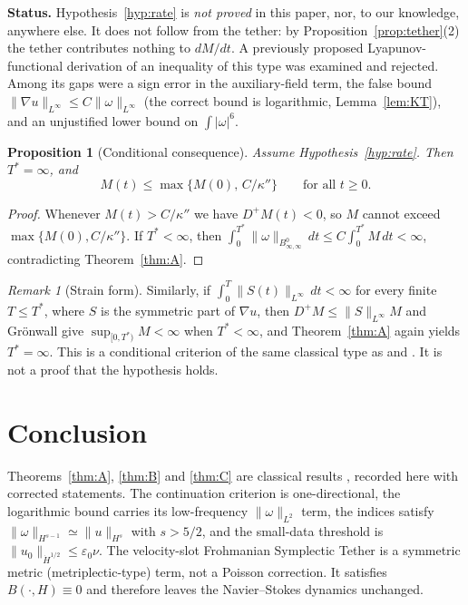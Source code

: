 \documentclass[11pt,reqno]{amsart}
\newtheorem{proposition}[lemma]{Proposition}
\theoremstyle{definition}
\theoremstyle{remark}
\newtheorem{remark}[lemma]{Remark}
\newcommand{\Bz}{B^0_{\infty,\infty}}
\newcommand{\dH}[1]{\dot H^{#1}}
\newcommand{\norm}[1]{\lVert #1\rVert}
\newcommand{\abs}[1]{\lvert #1\rvert}
\begin{document}
\noindent\textbf{Status.} Hypothesis~\ref{hyp:rate} is \emph{not proved} in this paper, nor, to our knowledge, anywhere else. It does not follow from the tether: by Proposition~\ref{prop:tether}(2) the tether contributes nothing to $dM/dt$. A previously proposed Lyapunov-functional derivation of an inequality of this type was examined and rejected. Among its gaps were a sign error in the auxiliary-field term, the false bound $\norm{\nabla u}_{L^\infty}\le C\norm{\omega}_{L^\infty}$ (the correct bound is logarithmic, Lemma~\ref{lem:KT}), and an unjustified lower bound on $\int\abs{\omega}^6$.

\begin{proposition}[Conditional consequence]\label{prop:cond}
Assume Hypothesis~\ref{hyp:rate}. Then $T^*=\infty$, and
\[
M(t)\le\max\{M(0),\,C/\kappa''\}\qquad\text{for all }t\ge0 .
\]
\end{proposition}

\begin{proof}
Whenever $M(t)>C/\kappa''$ we have $D^+M(t)<0$, so $M$ cannot exceed $\max\{M(0),C/\kappa''\}$. If $T^*<\infty$, then $\int_0^{T^*}\norm{\omega}_{\Bz}\,dt\le C\int_0^{T^*}M\,dt<\infty$, contradicting Theorem~\ref{thm:A}.
\end{proof}

\begin{remark}[Strain form]\label{rem:strain}
Similarly, if $\int_0^{T}\norm{S(t)}_{L^\infty}\,dt<\infty$ for every finite $T\le T^*$, where $S$ is the symmetric part of $\nabla u$, then $D^+M\le\norm{S}_{L^\infty}M$ and Gr\"onwall give $\sup_{[0,T^*)}M<\infty$ when $T^*<\infty$, and Theorem~\ref{thm:A} again yields $T^*=\infty$. This is a conditional criterion of the same classical type as \cite{BKM1984} and \cite{CF1993}. It is not a proof that the hypothesis holds.
\end{remark}

\section{Conclusion}\label{sec:conclusion}

Theorems~\ref{thm:A}, \ref{thm:B} and \ref{thm:C} are classical results \cite{BKM1984,KT2000,KOT2002,Kato1972,FujitaKato1964}, recorded here with corrected statements. The continuation criterion is one-directional, the logarithmic bound carries its low-frequency $\norm{\omega}_{L^2}$ term, the indices satisfy $\norm{\omega}_{H^{s-1}}\simeq\norm{u}_{H^s}$ with $s>5/2$, and the small-data threshold is $\norm{u_0}_{\dH{1/2}}\le\varepsilon_0\nu$. The velocity-slot Frohmanian Symplectic Tether is a symmetric metric (metriplectic-type) term, not a Poisson correction. It satisfies $B(\cdot,H)\equiv0$ and therefore leaves the Navier--Stokes dynamics unchanged.
\end{document}
